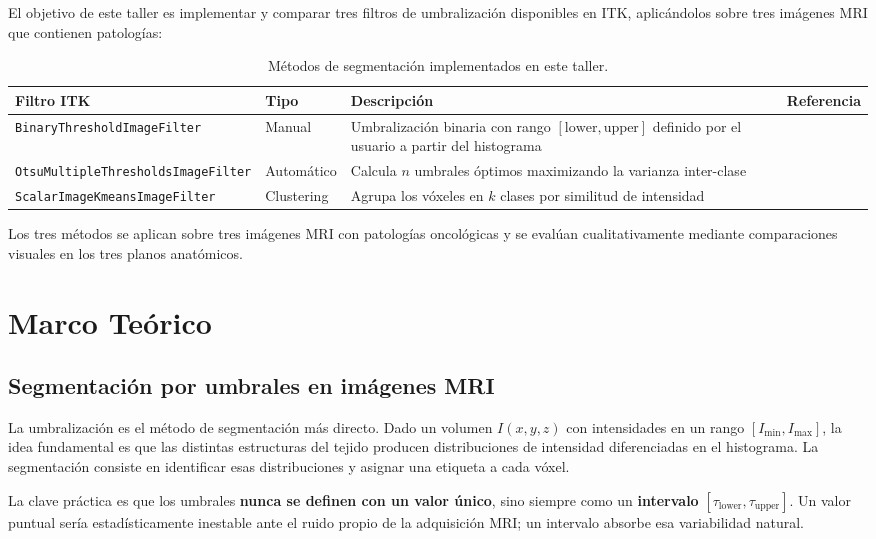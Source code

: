 \documentclass[12pt, a4paper]{article}
\begin{document}
El objetivo de este taller es implementar y comparar tres filtros de umbralización
disponibles en ITK, aplicándolos sobre tres imágenes MRI que contienen patologías:

\begin{table}[H]
\centering
\renewcommand{\arraystretch}{1.3}
\begin{tabularx}{\textwidth}{llXl}
\toprule
\textbf{Filtro ITK} & \textbf{Tipo} & \textbf{Descripción} & \textbf{Referencia} \\
\midrule
\texttt{BinaryThresholdImageFilter} &
  Manual &
  Umbralización binaria con rango $[\text{lower}, \text{upper}]$ definido por el usuario a partir del histograma &
  \cite{itkbinary} \\
\texttt{OtsuMultipleThresholdsImageFilter} &
  Automático &
  Calcula $n$ umbrales óptimos maximizando la varianza inter-clase &
  \cite{itkotsu} \\
\texttt{ScalarImageKmeansImageFilter} &
  Clustering &
  Agrupa los vóxeles en $k$ clases por similitud de intensidad &
  \cite{itkkmeans} \\
\bottomrule
\end{tabularx}
\caption{Métodos de segmentación implementados en este taller.}
\label{tab:metodos}
\end{table}

Los tres métodos se aplican sobre tres imágenes MRI con patologías oncológicas y se
evalúan cualitativamente mediante comparaciones visuales en los tres planos anatómicos.

\section{Marco Teórico}

\subsection{Segmentación por umbrales en imágenes MRI}

La umbralización es el método de segmentación más directo. Dado un volumen $I(x,y,z)$
con intensidades en un rango $[I_{\min}, I_{\max}]$, la idea fundamental es que las
distintas estructuras del tejido producen distribuciones de intensidad diferenciadas en el
histograma. La segmentación consiste en identificar esas distribuciones y asignar una
etiqueta a cada vóxel.

La clave práctica es que los umbrales \textbf{nunca se definen con un valor único}, sino
siempre como un \textbf{intervalo} $[\tau_{\text{lower}}, \tau_{\text{upper}}]$. Un valor
puntual sería estadísticamente inestable ante el ruido propio de la adquisición MRI; un
intervalo absorbe esa variabilidad natural.
\end{document}
